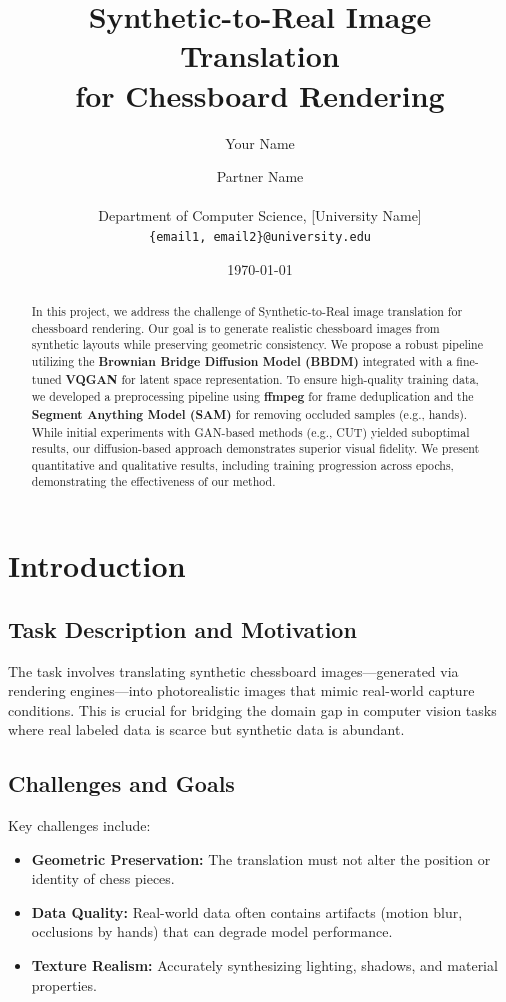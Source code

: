 \documentclass[12pt,a4paper]{article}
\title{\textbf{Synthetic-to-Real Image Translation\\for Chessboard Rendering}}
\author{
    Your Name \and 
    Partner Name \\
    \\
    Department of Computer Science, [University Name]\\
    \texttt{\{email1, email2\}@university.edu}
}
\date{\today}
\begin{document}
\maketitle

\begin{abstract}
In this project, we address the challenge of Synthetic-to-Real image translation for chessboard rendering. Our goal is to generate realistic chessboard images from synthetic layouts while preserving geometric consistency. We propose a robust pipeline utilizing the \textbf{Brownian Bridge Diffusion Model (BBDM)} integrated with a fine-tuned \textbf{VQGAN} for latent space representation. To ensure high-quality training data, we developed a preprocessing pipeline using \textbf{ffmpeg} for frame deduplication and the \textbf{Segment Anything Model (SAM)} for removing occluded samples (e.g., hands). While initial experiments with GAN-based methods (e.g., CUT) yielded suboptimal results, our diffusion-based approach demonstrates superior visual fidelity. We present quantitative and qualitative results, including training progression across epochs, demonstrating the effectiveness of our method.
\end{abstract}

\section{Introduction}
\label{sec:introduction}

\subsection{Task Description and Motivation}
The task involves translating synthetic chessboard images—generated via rendering engines—into photorealistic images that mimic real-world capture conditions. This is crucial for bridging the domain gap in computer vision tasks where real labeled data is scarce but synthetic data is abundant.

\subsection{Challenges and Goals}
Key challenges include:
\begin{itemize}
    \item \textbf{Geometric Preservation:} The translation must not alter the position or identity of chess pieces.
    \item \textbf{Data Quality:} Real-world data often contains artifacts (motion blur, occlusions by hands) that can degrade model performance.
    \item \textbf{Texture Realism:} Accurately synthesizing lighting, shadows, and material properties.
\end{itemize}
\end{document}
